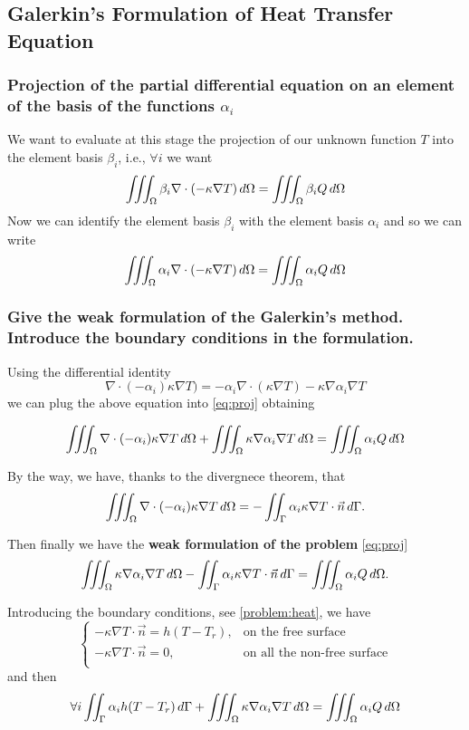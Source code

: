 \subsection{Galerkin’s Formulation of Heat Transfer Equation}
\subsubsection{Projection of the partial differential equation on an element of the basis of the functions $ \alpha_i $}
We want to evaluate at this stage the projection of our unknown function $ T $ into the element basis $ \beta_i $, i.e., $ \forall i $ we want 
\begin{equation}
\label{eq:proj}
\iiint_{\Omega}\beta_i\nabla\cdot(-\kappa\nabla T)\mathop{}\!d\Omega=\iiint_{\Omega}\beta_i Q\mathop{}\!d\Omega
\end{equation} 
Now we can identify the element basis $ \beta_i $ with the element basis $ \alpha_i $ and so we can write  
\[\iiint_{\Omega}\alpha_i\nabla\cdot(-\kappa\nabla T)\mathop{}\!d\Omega=\iiint_{\Omega}\alpha_i Q\mathop{}\!d\Omega \]

\subsubsection{Give the weak formulation of the Galerkin’s method. Introduce the boundary conditions in the formulation.}
\begin{mdframed}
	Using the differential identity 
	\[\nabla\cdot(-\alpha_i)\kappa\nabla T)=-\alpha_i\nabla\cdot(\kappa\nabla T)-\kappa\nabla\alpha_i\nabla T\]
	we can plug the above equation into \eqref{eq:proj} obtaining 
	
	\[\iiint_{\Omega}\nabla\cdot(-\alpha_i)\kappa\nabla T\mathop{}\!d\Omega+\iiint_{\Omega}\kappa\nabla\alpha_i\nabla T\mathop{}\!d\Omega=\iiint_{\Omega}\alpha_i Q\mathop{}\!d\Omega\]
	
	By the way, we have, thanks to the divergnece theorem, that 
	\[\iiint_{\Omega}\nabla\cdot(-\alpha_i)\kappa\nabla T\mathop{}\!d\Omega=-\iint_{\Gamma}\alpha_i\kappa\nabla T\cdot\vec{n}\mathop{}\!d\Gamma. \]
	
	Then finally we have the \textbf{weak formulation of the problem} \eqref{eq:proj}
	\[ \iiint_{\Omega}\kappa\nabla\alpha_i\nabla T\mathop{}\!d\Omega-\iint_{\Gamma}\alpha_i\kappa\nabla T\cdot\vec{n}\mathop{}\!d\Gamma=\iiint_{\Omega}\alpha_i Q\mathop{}\!d\Omega. \]
	\medskip
	
	Introducing the boundary conditions, see \eqref{problem:heat}, we have
	\[\begin{cases}
	-\kappa\nabla T\cdot \vec{n}=h(T-T_r),& \text{on the free surface}\\
	-\kappa\nabla T\cdot \vec{n}=0,&\text{on all the non-free surface}\\
	\end{cases}\]
	and then 
	\begin{equation}
	\forall i \iint_{\Gamma}\alpha_i h(T-T_r)\mathop{}\!d\Gamma+\iiint_{\Omega}\kappa\nabla\alpha_i\nabla T\mathop{}\!d\Omega =\iiint_{\Omega}\alpha_i Q\mathop{}\!d\Omega
	\end{equation}
\end{mdframed}
